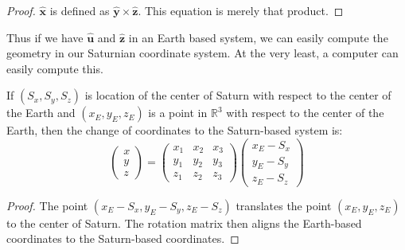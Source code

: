         \begin{proof}
            $\hat{\mathbf{x}}$ is defined as
            $\hat{\mathbf{y}}\times\hat{\mathbf{z}}$.
            This equation is merely that product.
        \end{proof}
        Thus if we have $\hat{\mathbf{u}}$ and
        $\hat{\mathbf{z}}$ in an Earth based system,
        we can easily compute the geometry in our
        Saturnian coordinate system. At the very least,
        a computer can easily compute this.
        \begin{theorem}
            If $(S_{x},S_{y},S_{z})$ is location of the
            center of Saturn with respect to the
            center of the Earth and $(x_{E},y_{E},z_{E})$
            is a point in $\mathbb{R}^{3}$ with respect
            to the center of the Earth, then the
            change of coordinates to the
            Saturn-based system is:
            \begin{equation*}
                    \begin{pmatrix}
                        x\\
                        y\\
                        z
                    \end{pmatrix}
                    =
                    \begin{pmatrix}
                        x_{1}&x_{2}&x_{3}\\
                        y_{1}&y_{2}&y_{3}\\
                        z_{1}&z_{2}&z_{3}
                    \end{pmatrix}
                    \begin{pmatrix}
                        x_{E}-S_{x}\\
                        y_{E}-S_{y}\\
                        z_{E}-S_{z}
                    \end{pmatrix}
                \end{equation*}
        \end{theorem}
        \begin{proof}
            The point
            $(x_{E}-S_{x},y_{E}-S_{y},z_{E}-S_{z})$
            translates the point $(x_{E},y_{E},z_{E})$
            to the center of Saturn.
            The rotation matrix then aligns the
            Earth-based coordinates to the
            Saturn-based coordinates.
        \end{proof}
